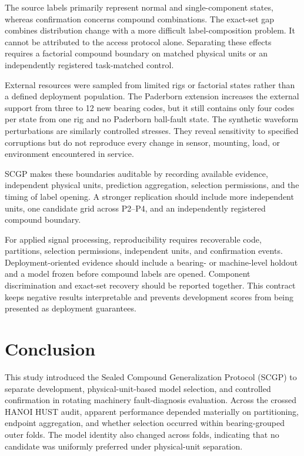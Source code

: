 \documentclass[machines,article,submit,oneauthor,pdftex]{Definitions/mdpi}
\begin{document}
The source labels primarily represent normal and single-component states, whereas confirmation concerns compound combinations. The exact-set gap combines distribution change with a more difficult label-composition problem. It cannot be attributed to the access protocol alone. Separating these effects requires a factorial compound boundary on matched physical units or an independently registered task-matched control.

External resources were sampled from limited rigs or factorial states rather than a defined deployment population. The Paderborn extension increases the external support from three to 12 new bearing codes, but it still contains only four codes per state from one rig and no Paderborn ball-fault state. The synthetic waveform perturbations are similarly controlled stresses. They reveal sensitivity to specified corruptions but do not reproduce every change in sensor, mounting, load, or environment encountered in service.

SCGP makes these boundaries auditable by recording available evidence, independent physical units, prediction aggregation, selection permissions, and the timing of label opening. A stronger replication should include more independent units, one candidate grid across P2--P4, and an independently registered compound boundary.

For applied signal processing, reproducibility requires recoverable code, partitions, selection permissions, independent units, and confirmation events. Deployment-oriented evidence should include a bearing- or machine-level holdout and a model frozen before compound labels are opened. Component discrimination and exact-set recovery should be reported together. This contract keeps negative results interpretable and prevents development scores from being presented as deployment guarantees.

\section{Conclusion}

This study introduced the Sealed Compound Generalization Protocol (SCGP) to separate development, physical-unit-based model selection, and controlled confirmation in rotating machinery fault-diagnosis evaluation. Across the crossed HANOI HUST audit, apparent performance depended materially on partitioning, endpoint aggregation, and whether selection occurred within bearing-grouped outer folds. The model identity also changed across folds, indicating that no candidate was uniformly preferred under physical-unit separation.
\end{document}
